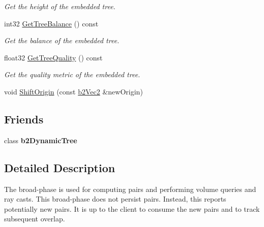 \begin{DoxyCompactItemize}
\begin{DoxyCompactList}\small\item\em Get the height of the embedded tree. \end{DoxyCompactList}\item 
int32 \hyperlink{classb2_broad_phase_a1189e783d39bfd69b314284ce52ea3c3}{Get\+Tree\+Balance} () const \hypertarget{classb2_broad_phase_a1189e783d39bfd69b314284ce52ea3c3}{}\label{classb2_broad_phase_a1189e783d39bfd69b314284ce52ea3c3}

\begin{DoxyCompactList}\small\item\em Get the balance of the embedded tree. \end{DoxyCompactList}\item 
float32 \hyperlink{classb2_broad_phase_abe02c30ca1b3b9c9b84a571a2f8cef92}{Get\+Tree\+Quality} () const \hypertarget{classb2_broad_phase_abe02c30ca1b3b9c9b84a571a2f8cef92}{}\label{classb2_broad_phase_abe02c30ca1b3b9c9b84a571a2f8cef92}

\begin{DoxyCompactList}\small\item\em Get the quality metric of the embedded tree. \end{DoxyCompactList}\item 
void \hyperlink{classb2_broad_phase_a410e6115e3d1b4fca61cfbf397767772}{Shift\+Origin} (const \hyperlink{structb2_vec2}{b2\+Vec2} \&new\+Origin)
\end{DoxyCompactItemize}
\subsection*{Friends}
\begin{DoxyCompactItemize}
\item 
class {\bfseries b2\+Dynamic\+Tree}\hypertarget{classb2_broad_phase_afc450dc71ee33ab0c9e7f1c31d6f7f60}{}\label{classb2_broad_phase_afc450dc71ee33ab0c9e7f1c31d6f7f60}

\end{DoxyCompactItemize}


\subsection{Detailed Description}
The broad-\/phase is used for computing pairs and performing volume queries and ray casts. This broad-\/phase does not persist pairs. Instead, this reports potentially new pairs. It is up to the client to consume the new pairs and to track subsequent overlap. 

